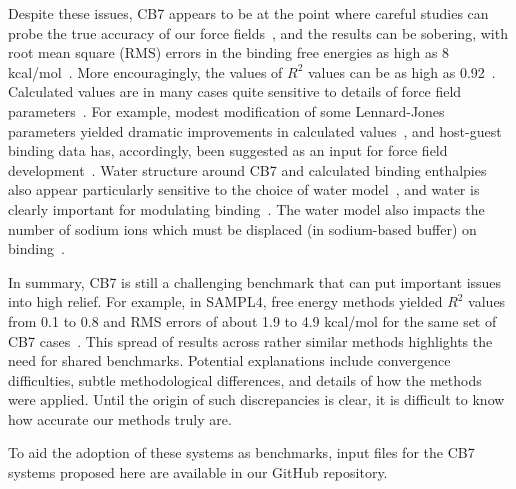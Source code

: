 \documentclass[aps,pre,twocolumn,nofootinbib,superscriptaddress,10pt, final,tightenlines]{revtex4-1}
\begin{document}
Despite these issues, CB7 appears to be at the point where careful studies can probe the true accuracy of our force fields~\cite{hsiao_prediction_2014, muddana_prediction_2012,henriksen_computational_2015, gao_binding_2015, yin_toward_2015}, and the results can be sobering, with root mean square (RMS) errors in the binding free energies as high as 8 kcal/mol~\cite{henriksen_computational_2015, monroe_converging_2014}. 
More encouragingly, the values of $R^2$ values can be as high as 0.92~\cite{henriksen_computational_2015}. 
Calculated values are in many cases quite sensitive to details of force field parameters~\cite{monroe_converging_2014, moghaddam_new_2011, muddana_prediction_2012}. For example, modest modification of some Lennard-Jones parameters yielded dramatic improvements in calculated values~\cite{yin_toward_2015}, and host-guest binding data has, accordingly, been suggested as an input for force field development~\cite{yin_toward_2015, henriksen_computational_2015, gao_binding_2015}.
Water structure around CB7 and calculated binding enthalpies also appear particularly sensitive to the choice of water model~\cite{rogers_role_2013, fenley_bridging_2014, gao_binding_2015}, and water is clearly important for modulating binding~\cite{nguyen_grid_2012}.
The water model also impacts the number of sodium ions which must be displaced (in sodium-based buffer) on binding~\cite{gao_binding_2015, henriksen_computational_2015}.

In summary, CB7 is still a challenging benchmark that can put important issues into high relief. 
For example, in SAMPL4, free energy methods yielded $R^2$ values from 0.1 to 0.8 and RMS errors of about 1.9 to 4.9 kcal/mol for the same set of CB7 cases~\cite{muddana_sampl4_2014}. 
This spread of results across rather similar methods highlights the need for shared benchmarks. 
Potential explanations include convergence difficulties, subtle methodological differences, and details of how the methods were applied. 
Until the origin of such discrepancies is clear, it is difficult to know how accurate our methods truly are.

To aid the adoption of these systems as benchmarks, input files for the CB7 systems proposed here are available in our GitHub repository. 
\end{document}
